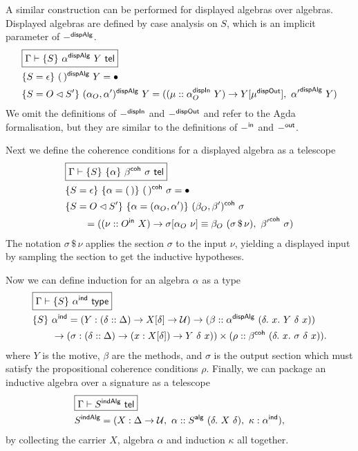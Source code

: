 A similar construction can be performed for displayed algebras over algebras.
Displayed algebras are defined by case analysis on $S$, which is an implicit parameter of $-^{\textsf{dispAlg}}$.
\begin{align*}
&\boxed{\Gamma \vdash \{S\}\ \alpha\D\ Y \tel} \\
& \{S = \epsilon\}\ (\,)\D\ Y = \bullet \\
&\{S = O \lhd S'\}\ (\alpha_O, \alpha')\D\ Y = ((\mu :: \alpha_O\DI\ Y) \to Y[\mu\DO],\ {\alpha'}\D\ Y)
\end{align*}
We omit the definitions of $-^{\textsf{dispIn}}$ and $-^{\textsf{dispOut}}$ and refer to the Agda formalisation, but they are similar to
the definitions of $-^{\textsf{in}}$ and $-^{\textsf{out}}$.

Next we define the coherence conditions for a displayed algebra as a telescope
\begin{align*}
&\boxed{\Gamma \vdash \{S\}\ \{\alpha\}\ \beta^{\textsf{coh}}\ \sigma \ \textsf{tel}} \\
& \{S = \epsilon\}\ \{\alpha = (\,)\}\ (\,)^{\textsf{coh}}\ \sigma = \bullet \\
& \{S = O \lhd S'\}\ \{\alpha = (\alpha_O, \alpha')\}\ (\beta_O, \beta')^{\textsf{coh}}\ \sigma \\
&\qquad = ((\nu :: O^{\textsf{in}}\ X) \to \sigma[\alpha_O\ \nu] \equiv \beta_O\ (\sigma \, \$ \, \nu),\  {\beta'}^{\textsf{coh}}\ \sigma)
\end{align*}
The notation $\sigma \, \$\, \nu$ applies the section $\sigma$ to the input $\nu$,
yielding a displayed input by sampling the section to get the inductive
hypotheses.

Now we can define induction for an algebra $\alpha$ as a type
\begin{align*}
&\boxed{\Gamma \vdash \{S\}\ \alpha\IND \type} \\
&\{S\}\ \alpha\IND = (Y : (\delta :: \Delta) \to X[\delta] \to \univ) \to (\beta :: \alpha\D\ (\delta.\ x.\ Y\ \delta\ x)) \\
&\qquad\to (\sigma : (\delta :: \Delta) \to (x : X[\delta]) \to Y\ \delta\ x)) \times (\rho :: \beta\COH\ (\delta.\ x.\ \sigma\ \delta\ x)).
\end{align*}
where $Y$ is the motive, $\beta$ are the methods, and $\sigma$ is the output section which must
satisfy the propositional coherence conditions $\rho$.
Finally, we can package an inductive algebra over a signature as a telescope
\begin{align*}
&\boxed{\Gamma \vdash S\INDA \tel} \\
&S\INDA = (X : \Delta \to \univ,\ \alpha :: S\A\ (\delta.\ X\ \delta),\ \kappa : \alpha\IND),
\end{align*}
by collecting the carrier $X$, algebra $\alpha$ and induction $\kappa$ all together.

